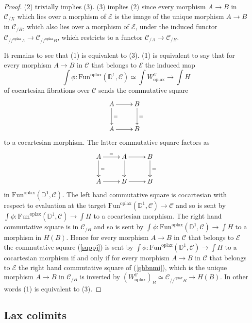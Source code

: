\documentclass[10pt,oneside]{article}
\numberwithin{equation}{section} %
\numberwithin{figure}{section} %
\theoremstyle{plain}
\theoremstyle{definition}
\newcommand{\bD}{{\mathbb D}}
\newcommand{\mC}{{\mathcal C}}
\newcommand{\mE}{{\mathcal E}}
\newcommand{\W}{W}
\newcommand{\Fun}{\mathrm{Fun}}
\newcommand{\oplax}{{\mathrm{oplax}}}
\begin{document}
\begin{proof}

(2) trivially implies (3). (3) implies (2) since every morphism 
$A \to B $ in $\mC_{/X}$ which lies over a morphism of $\mE$
is the image of the unique morphism $A \to B $ in $\mC_{/B}$, 
which also lies over a morphism of $\mE$, under the induced functor
$\mC_{//^\oplax A} \to \mC_{//^\oplax B}$, which restricts to a functor
$\mC_{/ A} \to \mC_{/ B}$.

It remains to see that (1) is equivalent to (3).
(1) is equivalent to say that for every morphism $A \to B$ in $\mC$ that belongs to $\mE$ the induced map $$\int \phi: \Fun^\oplax(\bD^1,\mC) \simeq \int \W^{\mC}_\oplax \to \int H $$ of cocartesian fibrations over $\mC$ sends the commutative square 
\begin{equation}\label{sqppj}
\xymatrix{
A \ar[r] \ar[d]^= & B \ar[d]^= \\
A \ar[r] & B
}
\end{equation}
to a cocartesian morphism.
The latter commutative square factors as 
\begin{equation}\label{gbbnmi}
\xymatrix{
A \ar[r]^= \ar[d]^= & A \ar[r] \ar[d] & B \ar[d]^= \\
A \ar[r] & B \ar[r]^= & B
}
\end{equation}
in $\Fun^\oplax(\bD^1,\mC).$
The left hand commutative square is cocartesian with respect to evaluation at the target $\Fun^\oplax(\bD^1,\mC) \to \mC$ and so is sent by $\int \phi: \Fun^\oplax(\bD^1,\mC) \to \int H $ to a cocartesian morphism.
The right hand commutative square is in $\mC_{/B}$ and so is sent by $\int \phi: \Fun^\oplax(\bD^1,\mC) \to \int H $ to a morphism in $H(B).$
Hence for every morphism $A \to B$ in $\mC$ that belongs to $\mE$
the commutative square (\ref{sqppj}) is sent by $\int \phi: \Fun^\oplax(\bD^1,\mC) \to \int H $ to a cocartesian morphism if and only if for every morphism $A \to B$ in $\mC$ that belongs to $\mE$
the right hand commutative square of (\ref{gbbnmi}), which is the unique morphism $A \to B$ in $\mC_{/B}$ is inverted by
$(\W^{\mC}_\oplax)_B \simeq \mC_{//^\oplax B} \to H(B) $.
In other words (1) is equivalent to (3).
\end{proof}

\subsection{Lax colimits}
\end{document}
